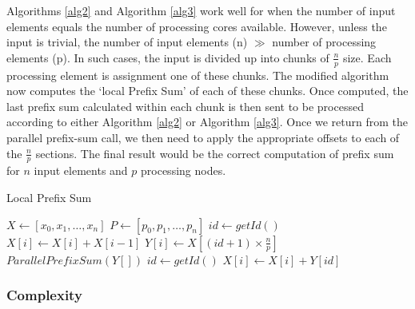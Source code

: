 \documentclass[11pt]{article}
\begin{document}
Algorithms \ref{alg2} and Algorithm \ref{alg3} work well for when the number of input elements equals the number of processing cores available. However, unless the input is trivial, the number of input elements (n) $\gg$ number of processing elements (p). In such cases, the input is divided up into chunks of $\frac{n}{p}$ size. Each processing element is assignment one of these chunks. The modified algorithm now computes the `local Prefix Sum' of each of these chunks. Once computed, the last prefix sum calculated within each chunk is then sent to be processed according to either Algorithm \ref{alg2} or Algorithm \ref{alg3}. Once we return from the parallel prefix-sum call, we then need to apply the appropriate offsets to each of the $\frac{n}{p}$ sections. The final result would be the correct computation of prefix sum for $n$ input elements and $p$ processing nodes. 

\begin{algorithm}
\caption{Local Prefix Sum}
\label{alg4}
\begin{algorithmic}[1]
  \State $X \leftarrow [x_{0}, x_{1}, \ldots, x_{n}]$
  \State $P \leftarrow [p_{0}, p_{1}, \ldots, p_{n}]$
  \State
      \State $id \leftarrow getId()$
        \State $X[i] \leftarrow X[i] + X[i - 1]$
      \EndFor
      \State $Y[i] \leftarrow X[(id + 1)\times\frac{n}{p}]$
    \EndFor
    \State
    \State $ParallelPrefixSum(Y[])$
    \State
      \State $id \leftarrow getId()$
        \State $X[i] \leftarrow X[i] + Y[id]$
      \EndFor
    \EndFor
\end{algorithmic}
\end{algorithm}

\subsubsection{Complexity}
\end{document}
